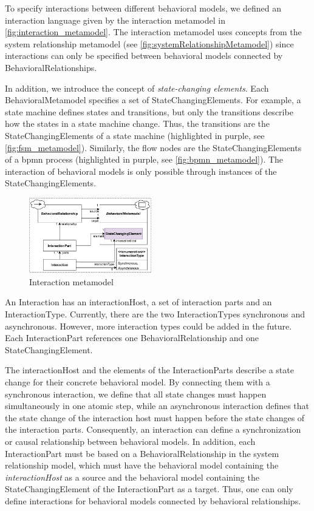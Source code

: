 \documentclass{jot}
\begin{document}
To specify interactions between different behavioral models, we defined an interaction language given by the interaction metamodel in \autoref{fig:interaction_metamodel}.
The interaction metamodel uses concepts from the system relationship metamodel (see \autoref{fig:systemRelationshipMetamodel}) since interactions can only be specified between behavioral models connected by \textsf{BehavioralRelationship}s.

In addition, we introduce the concept of \emph{state-changing elements}.
Each \textsf{BehavioralMetamodel} specifies a set of \textsf{StateChangingElement}s.
For example, a state machine defines states and transitions, but only the transitions describe how the states in a state machine change.
Thus, the transitions are the \textsf{StateChangingElement}s of a state machine (highlighted in purple, see \autoref{fig:fsm_metamodel}).
Similarly, the flow nodes are the \textsf{StateChangingElement}s of a \gls*{bpmn} process (highlighted in purple, see \autoref{fig:bpmn_metamodel}).
The interaction of behavioral models is only possible through instances of the \textsf{StateChangingElement}s.

\begin{figure}[h]
    \centering
    \includegraphics[width=0.475\textwidth]{figures/interaction_metamodel.pdf}
    \caption{Interaction metamodel}
    \label{fig:interaction_metamodel}
\end{figure}

An \textsf{Interaction} has an \textsf{interactionHost}, a set of interaction \textsf{parts} and an \textsf{InteractionType}.
Currently, there are the two \textsf{InteractionType}s \textsf{synchronous} and \textsf{asynchronous}.
However, more interaction types could be added in the future.
Each \textsf{InteractionPart} references one \textsf{BehavioralRelationship} and one \textsf{StateChangingElement}.

The \textsf{interactionHost} and the elements of the \textsf{InteractionPart}s describe a state change for their concrete behavioral model.
By connecting them with a synchronous interaction, we define that all state changes must happen simultaneously in one atomic step, while an asynchronous interaction defines that the state change of the interaction host must happen before the state changes of the interaction parts. 
Consequently, an interaction can define a synchronization or causal relationship between behavioral models.
In addition, each \textsf{InteractionPart} must be based on a \textsf{BehavioralRelationship} in the system relationship model, which must have the behavioral model containing the \textit{interactionHost} as a source and the behavioral model containing the \textsf{StateChangingElement} of the \textsf{InteractionPart} as a target.
Thus, one can only define interactions for behavioral models connected by behavioral relationships.
\end{document}
